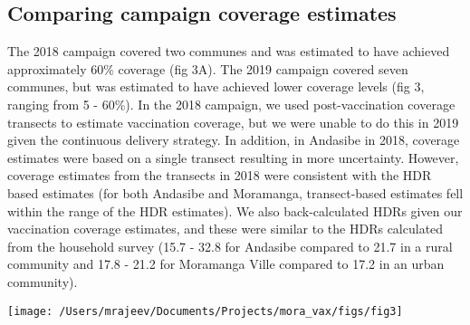 \documentclass[tropicalmed,article,submit,moreauthors,pdftex]{mdpi}
\begin{document}
\hypertarget{comparing-campaign-coverage-estimates}{%
\subsection{Comparing campaign coverage
estimates}\label{comparing-campaign-coverage-estimates}}

The 2018 campaign covered two communes and was estimated to have
achieved approximately 60\% coverage (fig 3A). The 2019 campaign covered
seven communes, but was estimated to have achieved lower coverage levels
(fig 3, ranging from 5 - 60\%). In the 2018 campaign, we used
post-vaccination coverage transects to estimate vaccination coverage,
but we were unable to do this in 2019 given the continuous delivery
strategy. In addition, in Andasibe in 2018, coverage estimates were
based on a single transect resulting in more uncertainty. However,
coverage estimates from the transects in 2018 were consistent with the
HDR based estimates (for both Andasibe and Moramanga, transect-based
estimates fell within the range of the HDR estimates). We also
back-calculated HDRs given our vaccination coverage estimates, and these
were similar to the HDRs calculated from the household survey (15.7 -
32.8 for Andasibe compared to 21.7 in a rural community and 17.8 - 21.2
for Moramanga Ville compared to 17.2 in an urban community).

\texttt{[image: /Users/mrajeev/Documents/Projects/mora\_vax/figs/fig3]}
\end{document}
